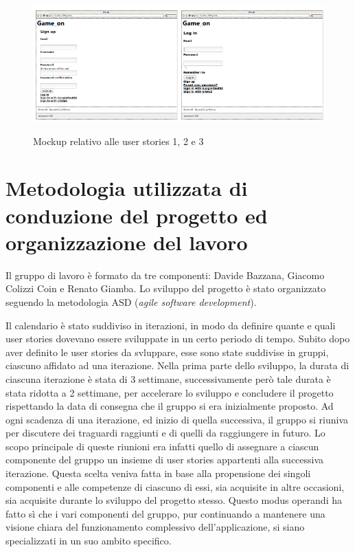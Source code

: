 \begin{figure}[h!]
\centering
\includegraphics[width=0.5\textwidth]{mockup_registration}\includegraphics[width=0.5\textwidth]{mockup_login}
\caption{Mockup relativo alle user stories 1, 2 e 3}
\end{figure}


\section{Metodologia utilizzata di conduzione del progetto ed organizzazione del lavoro}

Il gruppo di lavoro è formato da tre componenti: Davide Bazzana,
Giacomo Colizzi Coin e Renato Giamba.
\newline
\newline
Lo sviluppo del progetto è stato organizzato seguendo la metodologia
ASD (\textit{agile software development}).

Il calendario è stato suddiviso in iterazioni, in modo da definire
quante e quali user stories dovevano essere sviluppate in un certo
periodo di tempo. Subito dopo aver definito le user stories da
svluppare, esse sono state suddivise in gruppi, ciascuno affidato ad
una iterazione. Nella prima parte dello sviluppo, la durata di
ciascuna iterazione è stata di 3 settimane, successivamente però tale
durata è stata ridotta a 2 settimane, per accelerare lo sviluppo e
concludere il progetto rispettando la data di consegna che il gruppo
si era inizialmente proposto.  Ad ogni scadenza di una iterazione, ed
inizio di quella successiva, il gruppo si riuniva per discutere dei
traguardi raggiunti e di quelli da raggiungere in futuro. Lo scopo
principale di queste riunioni era infatti quello di assegnare a
ciascun componente del gruppo un insieme di user stories appartenti
alla successiva iterazione.  Questa scelta veniva fatta in base alla
propensione dei singoli componenti e alle competenze di ciascuno di
essi, sia acquisite in altre occasioni, sia acquisite durante lo
sviluppo del progetto stesso. Questo modus operandi ha fatto sì che i
vari componenti del gruppo, pur continuando a mantenere una visione
chiara del funzionamento complessivo dell'applicazione, si siano
specializzati in un suo ambito specifico.

